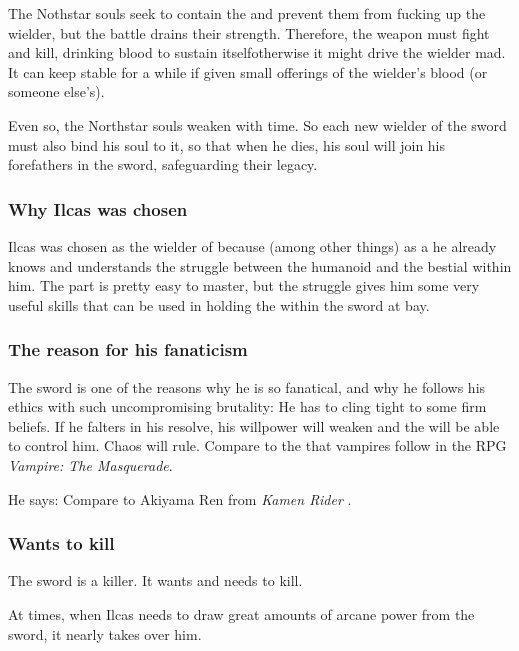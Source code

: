 The Nothstar souls seek to contain the \daemons{} and prevent them from fucking up the wielder, but the battle drains their strength. Therefore, the weapon must fight and kill, drinking blood to sustain itself\dash otherwise it might drive the wielder mad. It can keep stable for a while if given small offerings of the wielder's blood (or someone else's). 

Even so, the Northstar souls weaken with time. So each new wielder of the sword must also bind his soul to it, so that when he dies, his soul will join his forefathers in the sword, safeguarding their legacy. 





\subsubsection{Why Ilcas was chosen}
Ilcas was chosen as the wielder of \Telderain{} because (among other things) as a \nycaneer{} he already knows and understands the struggle between the humanoid and the bestial within him. The \nycan{} part is pretty easy to master, but the struggle gives him some very useful skills that can be used in holding the \daemons{} within the sword at bay. 





\subsubsection{The reason for his fanaticism}
The sword is one of the reasons why he is so fanatical, and why he follows his ethics with such uncompromising brutality: 
He has to cling tight to some firm beliefs. 
If he falters in his resolve, his willpower will weaken and the \daemons{} will be able to control him. 
Chaos will rule. 
Compare to the  that vampires follow in the RPG \emph{Vampire: The Masquerade}. 

He says:  
Compare to Akiyama Ren from \emph{Kamen Rider \Ryuki}. 





\subsubsection{Wants to kill}
The sword is a killer. 
It wants and needs to kill. 


At times, when Ilcas needs to draw great amounts of arcane power from the sword, it nearly takes over him. 

